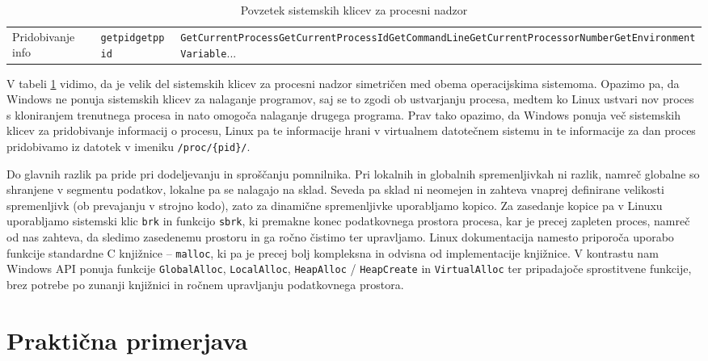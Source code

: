 \documentclass[a4paper,12pt,openright]{book}
\begin{document}
\begin{table}[h!]
\begin{center}
\begin{tabular}{ p{3.7cm}|p{2.5cm}|p{6cm} }
			Pridobivanje info & \verb|getpid|\newline\verb|getppid|                    & \verb|GetCurrentProcess|\newline\verb|GetCurrentProcessId|\newline\verb|GetCommandLine|\newline\verb|GetCurrentProcessorNumber|\newline\verb|GetEnvironmentVariable|\newline... \\
		\end{tabular}
	\end{center}
	\label{tab:process_control}
	\caption{Povzetek sistemskih klicev za procesni nadzor}
\end{table}

V tabeli \ref{tab:process_control} vidimo, da je velik del sistemskih klicev za procesni nadzor simetričen med obema operacijskima sistemoma.
Opazimo pa, da Windows ne ponuja sistemskih klicev za nalaganje programov, saj se to zgodi ob ustvarjanju procesa, medtem ko Linux ustvari nov proces s kloniranjem trenutnega procesa in nato omogoča nalaganje drugega programa.
Prav tako opazimo, da Windows ponuja več sistemskih klicev za pridobivanje informacij o procesu, Linux pa te informacije hrani v virtualnem datotečnem sistemu in te informacije za dan proces pridobivamo iz datotek v imeniku \verb|/proc/{pid}/|.

Do glavnih razlik pa pride pri dodeljevanju in sproščanju pomnilnika. Pri lokalnih in globalnih spremenljivkah ni razlik, namreč globalne so shranjene v segmentu podatkov, lokalne pa se nalagajo na sklad.
Seveda pa sklad ni neomejen in zahteva vnaprej definirane velikosti spremenljivk (ob prevajanju v strojno kodo), zato za dinamične spremenljivke uporabljamo kopico.
Za zasedanje kopice pa v Linuxu uporabljamo sistemski klic \verb|brk| in funkcijo \verb|sbrk|, ki premakne konec podatkovnega prostora procesa, kar je precej zapleten proces, namreč od nas zahteva, da sledimo zasedenemu prostoru in ga ročno čistimo ter upravljamo. Linux dokumentacija namesto priporoča uporabo funkcije standardne C knjižnice -- \verb|malloc|, ki pa je precej bolj kompleksna in odvisna od implementacije knjižnice.
V kontrastu nam Windows API ponuja funkcije \verb|GlobalAlloc|, \verb|LocalAlloc|, \verb|HeapAlloc| / \verb|HeapCreate| in \verb|VirtualAlloc| ter pripadajoče sprostitvene funkcije, brez potrebe po zunanji knjižnici in ročnem upravljanju podatkovnega prostora.

\section{Praktična primerjava}
\end{document}
